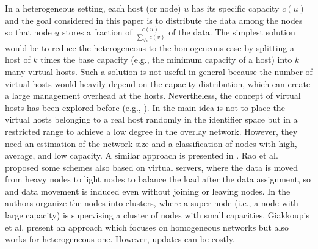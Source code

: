 \documentclass[11pt]{article}
\begin{document}
In a heterogeneous setting, each host (or node) $u$ has its specific capacity
$c(u)$ and the goal considered in this paper is to distribute the data among
the nodes so that node $u$ stores a fraction of $\frac{c(u)}{\sum_{\forall
v}{c(v)}}$ of the data. The simplest solution would be to reduce the
heterogeneous to the homogeneous case by splitting a host of $k$ times the
base capacity (e.g., the minimum capacity of a host) into $k$ many virtual
hosts. Such a solution is not useful in general because the number of virtual
hosts would heavily depend on the capacity distribution, which can create a
large management overhead at the hosts. Nevertheless, the concept of virtual
hosts has been explored before (e.g., \cite{godfrey,rao, skewccc+}). In
\cite{godfrey} the main idea is not to place the virtual hosts belonging to a
real host randomly in the identifier space but in a restricted range to
achieve a low degree in the overlay network. However, they need an estimation
of the network size and a classification of nodes with high, average, and low
capacity. A similar approach is presented in \cite{skewccc+}.
Rao et al. \cite{rao} proposed some schemes also based on virtual servers, where the data is moved from heavy nodes to light nodes to balance the load after the data assignment, so and data movement is induced even without joining or leaving nodes.
In \cite{supernode} the authors organize the nodes into clusters, where a
super node (i.e., a node with large capacity) is supervising a cluster of
nodes with small capacities. Giakkoupis et al. \cite{Giakkoupis} present an
approach which focuses on homogeneous networks but also works for
heterogeneous one. However, updates can be costly.
\end{document}
